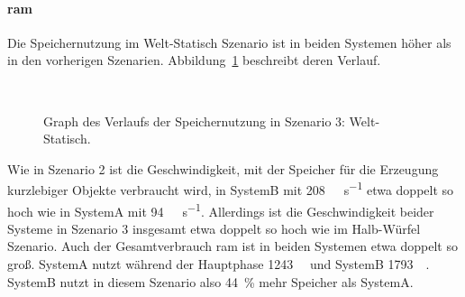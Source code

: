 \paragraph{\ac{ram}}
Die Speichernutzung im Welt-Statisch Szenario ist in beiden Systemen höher als in den vorherigen Szenarien. Abbildung~\ref{fig:seed-0-static-mem} beschreibt deren Verlauf. 
\begin{figure}[!htbp]
	\\
	\caption{Graph des Verlaufs der Speichernutzung in Szenario 3: Welt-Statisch.}\label{fig:seed-0-static-mem}
\end{figure} 
Wie in Szenario 2 ist die Geschwindigkeit, mit der Speicher für die Erzeugung kurzlebiger Objekte verbraucht wird, in SystemB mit \SI{208}{\mega\byte\per\second} etwa doppelt so hoch wie in SystemA mit \SI{94}{\mega\byte\per\second}. Allerdings ist die Geschwindigkeit beider Systeme in Szenario 3 insgesamt etwa doppelt so hoch wie im Halb-Würfel Szenario.
Auch der Gesamtverbrauch \ac{ram} ist in beiden Systemen etwa doppelt so groß. SystemA nutzt während der Hauptphase \SI{1243}{\mega\byte} und SystemB \SI{1793}{\mega\byte}. SystemB nutzt in diesem Szenario also \SI{44}{\percent} mehr Speicher als SystemA.   